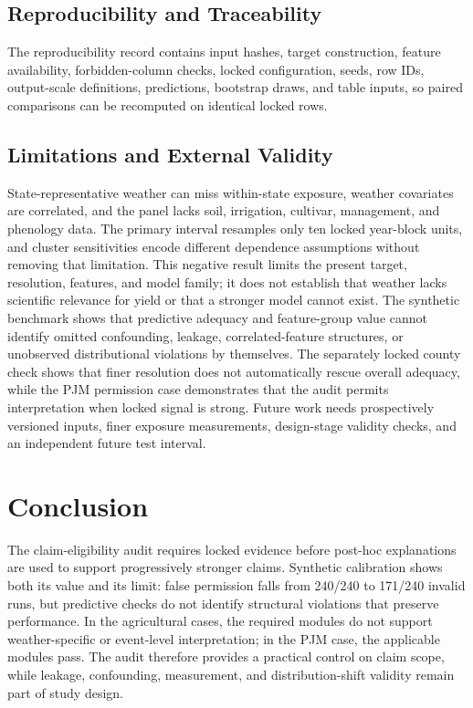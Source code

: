 \documentclass[conference]{IEEEtran}
\begin{document}
\subsection{Reproducibility and Traceability}
The reproducibility record contains input hashes, target construction, feature
availability, forbidden-column checks, locked configuration, seeds, row IDs,
output-scale definitions, predictions, bootstrap draws, and table inputs, so
paired comparisons can be recomputed on identical locked rows.

\subsection{Limitations and External Validity}
State-representative weather can miss within-state exposure, weather covariates
are correlated, and the panel lacks soil, irrigation, cultivar, management, and
phenology data. The primary interval resamples only ten locked year-block units, and
cluster sensitivities encode different dependence assumptions without removing
that limitation. This negative result limits the present target, resolution,
features, and model family; it does not establish that weather lacks scientific
relevance for yield or that a stronger model cannot exist. The synthetic
benchmark shows that predictive adequacy and feature-group value cannot identify
omitted confounding, leakage, correlated-feature structures, or unobserved
distributional violations by themselves. The separately locked county check shows
that finer resolution does not automatically rescue overall adequacy, while the
PJM permission case demonstrates that the audit permits interpretation when
locked signal is strong.
Future work needs prospectively versioned inputs, finer exposure measurements,
design-stage validity checks, and an independent future test interval.

\section{Conclusion}
The claim-eligibility audit requires locked evidence before post-hoc explanations
are used to support progressively stronger claims. Synthetic calibration shows
both its value and its limit: false permission falls from 240/240 to 171/240
invalid runs, but predictive checks do not identify structural violations that
preserve performance. In the agricultural cases, the required modules do not
support weather-specific or event-level interpretation; in the PJM case, the
applicable modules pass. The audit therefore provides a practical control on
claim scope, while leakage, confounding, measurement, and distribution-shift
validity remain part of study design.



\end{document}
